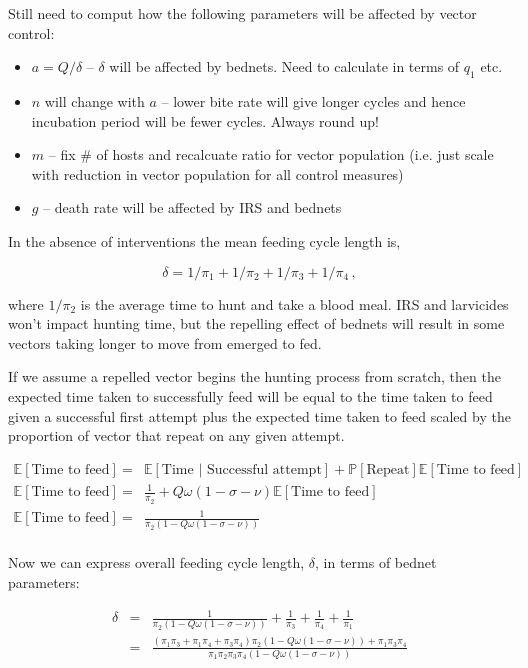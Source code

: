 \documentclass[a4paper,12pt]{article}
\begin{document}
\noindent Still need to comput how the following parameters will be affected by vector control:

\begin{itemize}
\item $a=Q/\delta$ -- $\delta$ will be affected by bednets. Need to calculate in terms of $q_1$ etc.
\item $n$ will change with $a$ -- lower bite rate will give longer cycles and hence incubation period will be fewer cycles. Always round up!
\item $m$ -- fix \# of hosts and recalcuate ratio for vector population (i.e. just scale with reduction in vector population for all control measures)
\item $g$ -- death rate will be affected by IRS and bednets
\end{itemize}

In the absence of interventions the mean feeding cycle length is,

\begin{equation}
\delta = 1/\pi_1+1/\pi_2+1/\pi_3+1/\pi_4\,,
\end{equation}

where $1/\pi_2$ is the average time to hunt and take a blood meal. IRS and larvicides won't impact hunting time, but the repelling effect of bednets will result in some vectors taking longer to move from emerged to fed.

If we assume a repelled vector begins the hunting process from scratch, then the expected time taken to successfully feed will be equal to the time taken to feed given a successful first attempt plus the expected time taken to feed scaled by the proportion of vector that repeat on any given attempt.

\begin{eqnarray}
\mathbb{E}[\mbox{Time to feed}] &=& \mathbb{E}[\mbox{Time }|\mbox{ Successful attempt}] + \mathbb{P}[\mbox{Repeat}]\mathbb{E}[\mbox{Time to feed}]\\
\mathbb{E}[\mbox{Time to feed}] &=& \frac{1}{\pi_2} + Q\omega(1-\sigma-\nu)\mathbb{E}[\mbox{Time to feed}]\\
\mathbb{E}[\mbox{Time to feed}] &=& \frac{1}{\pi_2(1-Q\omega(1-\sigma-\nu))}\\
\end{eqnarray}

Now we can express overall feeding cycle length, $\delta$, in terms of bednet parameters:

\begin{eqnarray}
\delta &=& \frac{1}{\pi_2(1-Q\omega(1-\sigma-\nu))} + \frac{1}{\pi_3}+\frac{1}{\pi_4}+\frac{1}{\pi_1}\\
&=& \frac{(\pi_1\pi_3+\pi_1\pi_4+\pi_3\pi_4)\pi_2(1-Q\omega(1-\sigma-\nu))+\pi_1\pi_3\pi_4}{\pi_1\pi_2\pi_3\pi_4(1-Q\omega(1-\sigma-\nu))}
\end{eqnarray}
\end{document}
